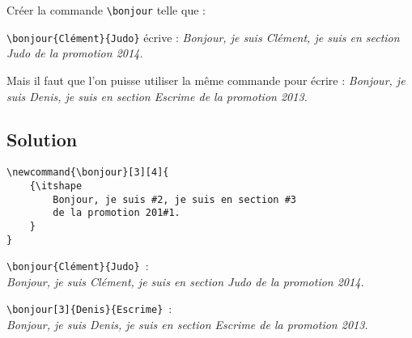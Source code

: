 \documentclass[a4paper, 11pt]{article}
\begin{document}
        Créer la commande \verb!\bonjour! telle que :

        \verb!\bonjour{Clément}{Judo}! écrive : \textit{Bonjour, je suis Clément, je suis en section Judo de la promotion 2014.}

        Mais il faut que l'on puisse utiliser la même commande pour écrire : \textit{Bonjour, je suis Denis, je suis en section Escrime de la promotion 2013.}

        \clearpage
        \subsection{Solution}

        \begin{verbatim}
\newcommand{\bonjour}[3][4]{
    {\itshape
        Bonjour, je suis #2, je suis en section #3
        de la promotion 201#1.
    }
}
        \end{verbatim}

        \newcommand{\bonjour}[3][4]{{\itshape Bonjour, je suis #2, je suis en section #3 de la promotion 201#1.}}

        \verb!\bonjour{Clément}{Judo}!~:\\ \bonjour{Clément}{Judo}

        \verb!\bonjour[3]{Denis}{Escrime}!~:\\ \bonjour[3]{Denis}{Escrime}
\end{document}
